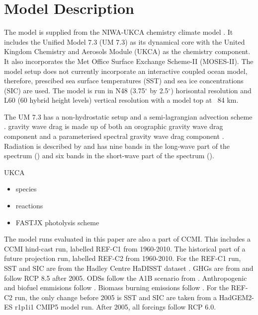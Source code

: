 \section{Model Description}

The model is supplied from the NIWA-UKCA chemistry climate model \citep{Morgenstern:2009bu}. It includes the Unified Model 7.3 (UM 7.3) as its dynamical core with the United Kingdom Chemistry and Aerosols Module (UKCA) as the chemistry component. It also incorporates the Met Office Surface Exchange Scheme-II (MOSES-II). The model setup does not currently incorporate an interactive coupled ocean model, therefore, prescibed sea surface temperatures (SST) and sea ice concentrations (SIC) are used. The model is run in N48 (3.75$^\circ$ by 2.5$^\circ$) horisontal resolution and L60 (60 hybrid height levels) vertical resolution with a model top at ~84 km.

The UM 7.3 has a non-hydrostatic setup \citep{Davies:2005vu} and a semi-lagrangian advection scheme \citep{Priestley:1993ur}. gravity wave drag is made up of both an orographic gravity wave drag component \citep{Webster:2003vf} and a parameterised spectral gravity wave drag component \citep{Scaife:2002vt}. Radiation is described by \cite{Edwards:1996wo} and has nine bands in the long-wave part of the spectrum () and six bands in the short-wave part of the spectrum ().

UKCA
\begin{itemize}
\item species
\item reactions
\item FASTJX photolysis scheme
\end{itemize}

The model runs evaluated in this paper are also a part of CCMI. This includes a CCMI hind-cast run, labelled REF-C1 from 1960-2010. The historical part of a future projection run, labelled REF-C2 from 1960-2010. For the REF-C1 run, SST and SIC are from the Hadley Centre HaDISST dataset \citep{Rayner:2003ty}. GHGs are from \citep{Meinshausen:2011is} \citep{Riahi:2011dk} and follow RCP 8.5 after 2005. ODSs follow the A1B scenario from \citep{WMO:2011vf}. Anthropogenic and biofuel emmisions follow \citep{Granier:2011dw}. Biomass burning emissions follow \citep{Lamarque:2011wr} \citep{vanderWerf:2006gi} \citep{Schultz:2008wf}. For the REF-C2 run, the only change before 2005 is SST and SIC are taken from a HadGEM2-ES r1p1i1 CMIP5 model run. After 2005, all forcings follow RCP 6.0.

